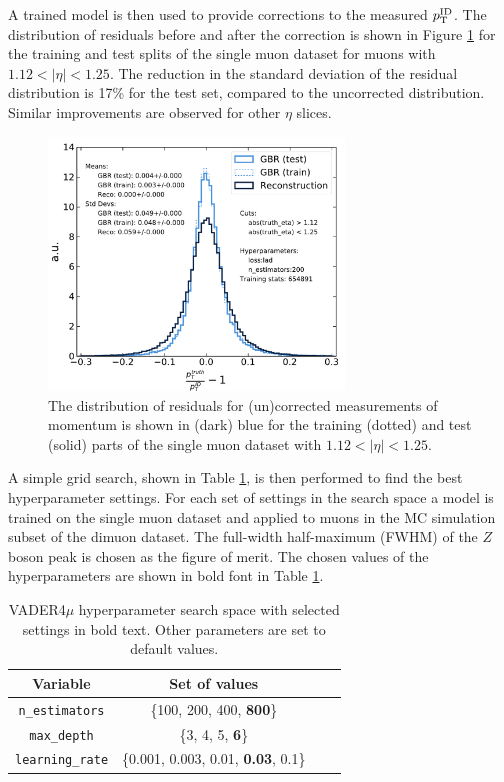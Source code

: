 A trained model is then used to provide corrections to the
measured $p_{\text{T}}^\text{ID}$. The distribution of residuals before and
after the correction is shown in Figure \ref{fig:muon:vader-single}
for the training and test splits of the single muon dataset for muons
with $1.12 < |\eta| < 1.25$. The reduction in the standard deviation
of the residual distribution is 17\% for the test set, compared to
the uncorrected distribution. Similar improvements are observed for
other $\eta$ slices.
\begin{figure}[h!]
  \centering
  \includegraphics[width=0.7\textwidth]{figures/muons/vader-single}
  \caption[VADER4$\mu$ correction on the single muon dataset]
  {The distribution of residuals for (un)corrected measurements of
  momentum is shown in (dark) blue for the training (dotted)
  and test (solid) parts of the single muon dataset with
  $1.12 < |\eta| < 1.25$.}
  \label{fig:muon:vader-single}
\end{figure}
A simple grid search, shown in Table \ref{tab:muon:grid}, is then
performed to find the best hyperparameter settings. For each 
set of settings in the search space a 
model is trained on the single muon dataset and applied to muons
in the MC simulation subset of the dimuon dataset. The full-width
half-maximum (FWHM) of the $Z$ boson peak is chosen as the figure of
merit. The chosen values of the hyperparameters are shown in bold
font in Table \ref{tab:muon:grid}.
\begin{table}[h]
\centering
\caption{VADER4$\mu$ hyperparameter search space with selected settings
in bold text. Other parameters are set to default values.}
\label{tab:muon:grid}
\begin{tabular}{c c c c }
\toprule
\midrule
Variable & Set of values \\
\midrule
\texttt{n\_estimators} & \{100, 200, 400, \textbf{800}\} \\
\texttt{max\_depth} & \{3, 4, 5, \textbf{6}\} \\
\texttt{learning\_rate} & \{0.001, 0.003, 0.01, \textbf{0.03}, 0.1\} \\
\midrule
\bottomrule
\end{tabular}
\end{table}
